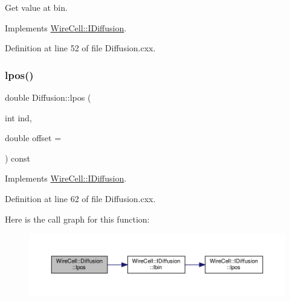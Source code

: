 Get value at bin. 



Implements \hyperlink{class_wire_cell_1_1_i_diffusion_ae37342e7b048d186c14fe86e81d706c5}{Wire\+Cell\+::\+I\+Diffusion}.



Definition at line 52 of file Diffusion.\+cxx.

\mbox{\label{class_wire_cell_1_1_diffusion_a406a933c156b668dc25555e4aa851567}} 
\subsubsection{\texorpdfstring{lpos()}{lpos()}}
{\footnotesize\ttfamily double Diffusion\+::lpos (\begin{DoxyParamCaption}\item[{int}]{ind,  }\item[{double}]{offset = {} }\end{DoxyParamCaption}) const\hspace{0.3cm}{\ttfamily [virtual]}}



Implements \hyperlink{class_wire_cell_1_1_i_diffusion_a6e85228ca6d4b6848bb8f80a1018a2aa}{Wire\+Cell\+::\+I\+Diffusion}.



Definition at line 62 of file Diffusion.\+cxx.

Here is the call graph for this function\+:
\nopagebreak
\begin{figure}[H]
\begin{center}
\leavevmode
\includegraphics[width=350pt]{class_wire_cell_1_1_diffusion_a406a933c156b668dc25555e4aa851567_cgraph}
\end{center}
\end{figure}
\mbox{\label{class_wire_cell_1_1_diffusion_aa590710356f717e695ebd9d49e3ef207}} 
